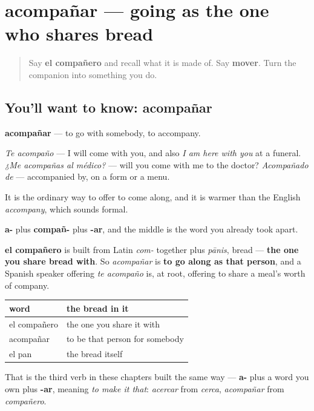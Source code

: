 \section[acompañar]{acompañar — going as the one who shares bread}

\label{lesson:ES-C446-acompanar}



\begin{quote}
Say \textbf{el compañero} and recall what it is made of. Say \textbf{mover}. Turn the companion into something you do.
\end{quote}

\subsection*{You'll want to know: acompañar}
\textbf{acompañar} — to go with somebody, to accompany.

\emph{Te acompaño} — I will come with you, and also \emph{I am here with you} at a funeral. \emph{¿Me acompañas al médico?} — will you come with me to the doctor? \emph{Acompañado de} — accompanied by, on a form or a menu.

It is the ordinary way to offer to come along, and it is warmer than the English \emph{accompany}, which sounds formal.

\begin{cousinweb}
\textbf{a-} plus \textbf{compañ-} plus \textbf{-ar}, and the middle is the word you already took apart.

\textbf{el compañero} is built from Latin \emph{com-} together plus \emph{pānis}, bread — \textbf{the one you share bread with}. So \emph{acompañar} is \textbf{to go along as that person}, and a Spanish speaker offering \emph{te acompaño} is, at root, offering to share a meal's worth of company.

\noindent
\begin{tabularx}{\linewidth}{@{}>{\raggedright\arraybackslash}X>{\raggedright\arraybackslash}X@{}}
\toprule
\textbf{word} & \textbf{the bread in it} \\
\midrule
el compañero & the one you share it with \\
acompañar & to be that person for somebody \\
el pan & the bread itself \\
\bottomrule
\end{tabularx}

That is the third verb in these chapters built the same way — \textbf{a-} plus a word you own plus \textbf{-ar}, meaning \emph{to make it that}: \emph{acercar} from \emph{cerca}, \emph{acompañar} from \emph{compañero}.
\end{cousinweb}

